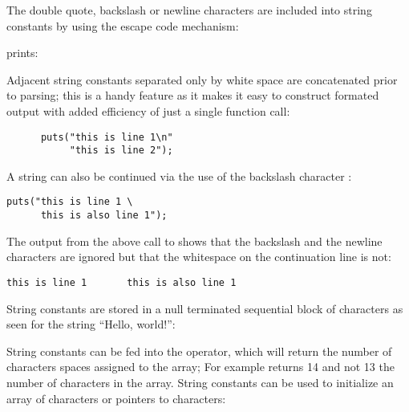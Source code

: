 The double quote, backslash or newline characters are included into
string constants by using the escape code mechanism:
\begin{quote}
\end{quote}
 prints:
\begin{quote}
\end{quote}
 
Adjacent string constants separated only by white space are
concatenated prior to parsing; this is a handy feature as it makes it
easy to construct formated output with added efficiency of just a
single function call:
\begin{verbatim}
      puts("this is line 1\n"
           "this is line 2");
\end{verbatim}

A string can also be
 continued via  the use of the backslash character \T{$\backslash$}:
\begin{production}
\begin{verbatim}
puts("this is line 1 \
      this is also line 1");
\end{verbatim}
\end{production}

The output from the above call to  shows that the backslash
and the newline characters are ignored but that the whitespace on the
continuation line is not:

\begin{production}
\begin{verbatim}
this is line 1       this is also line 1
\end{verbatim}
\end{production}


String constants are stored in a null terminated sequential block of
characters as seen for the string ``Hello, world!'':\\

\begin{production}
\cell{,}\cell{\ }\cell{!}
\end{production}

String constants  can be fed into the  operator,
 which will return the number of characters spaces
assigned to the array; For example 
  returns 14 and not 13 the number of characters in the array.
 String constants can be used to initialize an array\index{initialize
string} of characters or pointers to characters:

